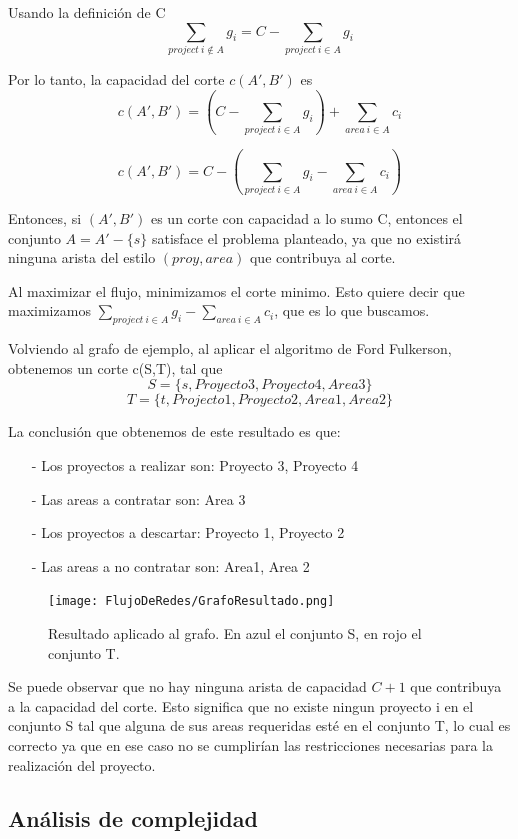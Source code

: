 Usando la definición de C
$$ \sum_{project\ i \notin A} g_i = C - \sum_{project\ i \in A} g_i$$

Por lo tanto, la capacidad del corte $c(A',B')$ es
$$c(A',B') = \left( C - \sum_{project\ i \in A} g_i \right)+  \sum_{area\ i \in A} c_i $$

$$c(A',B') = C - \left(\sum_{project\ i \in A} g_i - \sum_{area\ i \in A} c_i \right)$$


Entonces, si $(A', B')$ es un corte con capacidad a lo sumo C, entonces el conjunto $A = A' -\{s\}$ satisface el problema planteado, ya que no existirá ninguna arista del estilo $(proy, area)$ que 
contribuya al corte.

Al maximizar el flujo, minimizamos el corte minimo. Esto quiere decir que maximizamos $\sum_{project\ i \in A} g_i - \sum_{area\ i \in A} c_i$, que es lo que buscamos.



Volviendo al grafo de ejemplo, al aplicar el algoritmo de Ford Fulkerson, obtenemos un corte c(S,T), tal que $$S = \{ s, Proyecto 3, Proyecto 4, Area 3\}$$ 
$$ T = \{ t, Projecto 1, Proyecto 2, Area 1, Area 2 \}$$

La conclusión que obtenemos de este resultado es que:
\begin{itemize}
 \item[-] Los proyectos a realizar son: Proyecto 3, Proyecto 4
 \item[-] Las areas a contratar son: Area 3
 \item[-] Los proyectos a descartar: Proyecto 1, Proyecto 2
 \item[-] Las areas a no contratar son: Area1, Area 2
\end{itemize}

\begin{figure}[H]
\centering
\texttt{[image: FlujoDeRedes/GrafoResultado.png]}
\caption{Resultado aplicado al grafo. En azul el conjunto S, en rojo el conjunto T.}
\end{figure}

Se puede observar que no hay ninguna arista de capacidad $C+1$ que contribuya a la capacidad del corte. Esto significa que no existe ningun proyecto i en el conjunto S tal que alguna de sus areas requeridas 
esté en el conjunto T, lo cual es correcto ya que en ese caso no se cumplirían las restricciones necesarias para la realización del proyecto.


\subsection{Análisis de complejidad}

